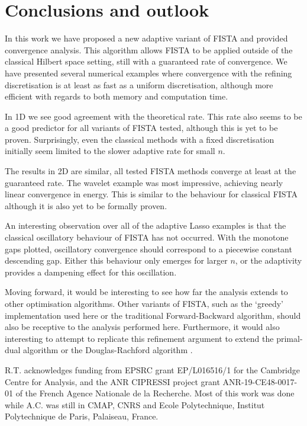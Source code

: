 \documentclass[smallextended]{svjour3}
\newcommand{\1}{\F{1}}
\begin{document}
	\section{Conclusions and outlook}
	In this work we have proposed a new adaptive variant of FISTA and provided convergence analysis. This algorithm allows FISTA to be applied outside of the classical Hilbert space setting, still with a guaranteed rate of convergence. We have presented several numerical examples where convergence with the refining discretisation is at least as fast as a uniform discretisation, although more efficient with regards to both memory and computation time. 
	
	In 1D we see good agreement with the theoretical rate. This rate also seems to be a good predictor for all variants of FISTA tested, although this is yet to be proven. Surprisingly, even the classical methods with a fixed discretisation initially seem limited to the slower adaptive rate for small $n$.
	
	The results in 2D are similar, all tested FISTA methods converge at least at the guaranteed rate. The wavelet example was most impressive, achieving nearly linear convergence in energy. This is similar to the behaviour for classical FISTA although it is also yet to be formally proven.
	
	An interesting observation over all of the adaptive Lasso examples is that the classical oscillatory behaviour of FISTA has not occurred. With the monotone gaps plotted, oscillatory convergence should correspond to a piecewise constant descending gap. Either this behaviour only emerges for larger $n$, or the adaptivity provides a dampening effect for this oscillation.
	
	Moving forward, it would be interesting to see how far the analysis extends to other optimisation algorithms. Other variants of FISTA, such as the `greedy' implementation used here or the traditional Forward-Backward algorithm, should also be receptive to the analysis performed here. Furthermore, it would also interesting to attempt to replicate this refinement argument to extend the primal-dual algorithm \cite{Chambolle2011} or the Douglas-Rachford algorithm \cite{Douglas1956}.
	
	\begin{acknowledgements}
		R.T. acknowledges funding from EPSRC grant EP/L016516/1 for the Cambridge Centre for Analysis, and the ANR CIPRESSI project grant ANR-19-CE48-0017-01 of the French Agence Nationale de la Recherche. Most of this work was done while A.C. was still in CMAP, CNRS and Ecole Polytechnique, Institut Polytechnique de Paris, Palaiseau, France.
	\end{acknowledgements}
	\begingroup
	
	\endgroup
	\appendix
\end{document}

